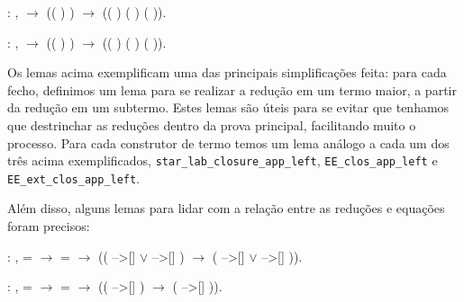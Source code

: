  :
\coqdockw{\ensuremath{\forall}}   
,   \ensuremath{\rightarrow}
(( )  )
\ensuremath{\rightarrow} (( )
(  ) (
 )).\coqdoceol

\smallskip

 :
\coqdockw{\ensuremath{\forall}}   
,   \ensuremath{\rightarrow}
(( ) 
) \ensuremath{\rightarrow} ((
) (  )
(  )).\coqdoceol
\bigskip

Os lemas acima exemplificam uma das principais simplificações feita: para cada
fecho, definimos um lema para se realizar a redução em um termo maior, a partir
da redução em um subtermo. Estes lemas são úteis para se evitar que tenhamos que
destrinchar as reduções dentro da prova principal, facilitando muito o processo.
Para cada construtor de termo temos um lema análogo a cada um dos três acima
exemplificados, \texttt{star\_lab\_closure\_app\_left},
\texttt{EE\_clos\_app\_left} e \texttt{EE\_ext\_clos\_app\_left}.

Além disso, alguns lemas para lidar com a relação entre as reduções e equações
foram precisos:

\bigskip
{} : \coqdockw{\ensuremath{\forall}}
   , 
=  \ensuremath{\rightarrow} 
=  \ensuremath{\rightarrow} ((
-->[]  \ensuremath{\lor} 
-->[] ) \ensuremath{\rightarrow} (
-->[]  \ensuremath{\lor} 
-->[] )).\coqdoceol

\smallskip

 :
\coqdockw{\ensuremath{\forall}}   
,  = 
\ensuremath{\rightarrow}  = 
\ensuremath{\rightarrow} (( -->[] )
\ensuremath{\rightarrow} ( -->[]
)).\coqdoceol
\bigskip


